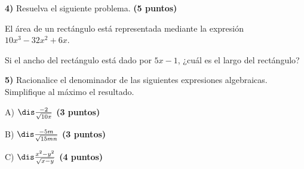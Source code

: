 \documentclass[12pt, fleqn]{article}
\begin{document}



{\bf 4)} Resuelva el siguiente problema. \hfill {\bf (5 puntos)}
\vs

\begin{tcolorbox}
El área de un rectángulo está representada mediante la expresión
$10x^3-32x^2+6x$. 

Si el ancho del rectángulo está dado por $5x-1$, ¿cuál es el largo del rectángulo?
\end{tcolorbox}

\vs\vs\vs\vs\vs\vs\vs\vs\vs\vs\vs\vs\vs\vs\vs

{\bf 5)} Racionalice el denominador de las siguientes expresiones algebraicas. Simplifique al máximo el resultado.

\benu
\item [A)] $\dis\frac{-2}{\sqrt{10x}}$ \hfill {\bf (3 puntos)}

\vs\vs\vs\vs

\item[B)] $\dis\frac{-5m}{\sqrt{15mn}}$ \hfill {\bf (3 puntos)}

\vs\vs\vs\vs

\item[C)] $\dis\frac{x^2-y^2}{\sqrt{x-y}}$ \hfill {\bf (4 puntos)}
\eenu
\end{document}
